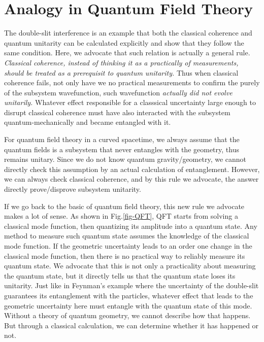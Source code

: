\documentclass[aps,showpacs,twocolumn,floats,prd,superscriptaddress,nofootinbib]{revtex4-1}
\begin{document}
\section{Analogy in Quantum Field Theory}
\label{sec-QFT}

The double-slit interference is an example that both the classical coherence and quantum unitarity can be calculated explicitly and show that they follow the same condition.
Here, we advocate that such relation is actually a general rule.
{\it Classical coherence, instead of thinking it as a practically of measurements, should be treated as a prerequisit to quantum unitarity.} 
Thus when classical coherence fails, not only have we no practical measurements to confirm the purely of the subsystem wavefunction, such wavefunction {\it actually did not evolve unitarily.}
Whatever effect responsible for a classsical uncertainty large enough to disrupt classical coherence must have also interacted with the subsystem quantum-mechanically and became entangled with it.

For quantum field theory in a curved spacetime, we always assume that the quantum fields is a subsystem that never entangles with the geometry, thus remains unitary.
Since we do not know quantum gravity/geometry, we cannot directly check this assumption by an actual calculation of entanglement.
However, we can always check classical coherence, and by this rule we advocate, the answer directly prove/disprove subsystem unitarity.

If we go back to the basic of quantum field theory, this new rule we advocate makes a lot of sense. As shown in Fig.\ref{fig-QFT}, QFT starts from solving a classical mode function, then quantizing its amplitude into a quantum state. 
Any method to measure such quantum state assumes the knowledge of the classical mode function. 
If the geometric uncertainty leads to an order one change in the classical mode function, then there is no practical way to reliably measure its quantum state. 
We advocate that this is not only a practicality about measuring the quantum state, but it directly tells us that the quantum state loses its unitarity. 
Just like in Feynman's example where the uncertainty of the double-slit guarantees its entanglement with the particles, whatever effect that leads to the geometric uncertainty here must entangle with the quantum state of this mode. 
Without a theory of quantum geometry, we cannot describe how that happens. 
But through a classical calculation, we can determine whether it has happened or not.
\end{document}
